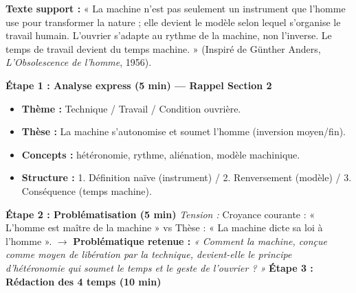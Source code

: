 \documentclass[11pt]{article}
\begin{document}
\begin{exoresolu}
\textbf{Texte support :} « La machine n'est pas seulement un instrument que l'homme use pour transformer la nature ; elle devient le modèle selon lequel s'organise le travail humain. L'ouvrier s'adapte au rythme de la machine, non l'inverse. Le temps de travail devient du temps machine. » (Inspiré de Günther Anders, \emph{L'Obsolescence de l'homme}, 1956).

\textbf{Étape 1 : Analyse express (5 min) — Rappel Section 2}
\begin{itemize}
    \item \textbf{Thème :} Technique / Travail / Condition ouvrière.
    \item \textbf{Thèse :} La machine s'autonomise et soumet l'homme (inversion moyen/fin).
    \item \textbf{Concepts :} hétéronomie, rythme, aliénation, modèle machinique.
    \item \textbf{Structure :} 1. Définition naïve (instrument) / 2. Renversement (modèle) / 3. Conséquence (temps machine).
\end{itemize}

\textbf{Étape 2 : Problématisation (5 min)}
\textit{Tension :} Croyance courante : « L'homme est maître de la machine » vs Thèse : « La machine dicte sa loi à l'homme ».
$\rightarrow$ \textbf{Problématique retenue :} \emph{« Comment la machine, conçue comme moyen de libération par la technique, devient-elle le principe d'hétéronomie qui soumet le temps et le geste de l'ouvrier ? »}
\tcblower
\textbf{Étape 3 : Rédaction des 4 temps (10 min)}


\end{exoresolu}
\end{document}
